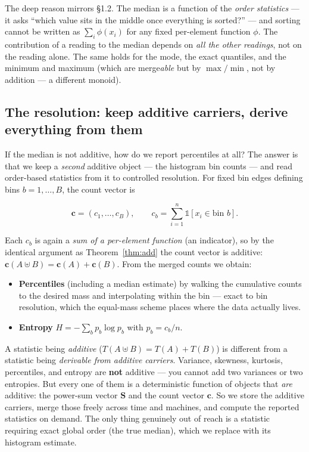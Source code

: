 \documentclass[11pt]{article}
\theoremstyle{definition}
\newcommand{\ind}{\mathbb{1}}
\newcommand{\powsum}{\mathbf{S}}
\begin{document}
The deep reason mirrors \S1.2. The median is a function of the \emph{order statistics} --- it asks
``which value sits in the middle once everything is sorted?'' --- and sorting cannot be written as
$\sum_i \phi(x_i)$ for any fixed per-element function $\phi$. The contribution of a reading to the
median depends on \emph{all the other readings}, not on the reading alone. The same holds for the
mode, the exact quantiles, and the minimum and maximum (which are merge\emph{able} but by
$\max/\min$, not by addition --- a different monoid).

\subsection{The resolution: keep additive carriers, derive everything from them}

If the median is not additive, how do we report percentiles at all? The answer is that we keep a
\emph{second} additive object --- the histogram bin counts --- and read order-based statistics from
it to controlled resolution. For fixed bin edges defining bins $b = 1, \dots, B$, the count vector is

\begin{equation}
  \mathbf{c} = (c_1, \dots, c_B),
  \qquad
  c_b = \sum_{i=1}^{n} \ind\!\left[x_i \in \text{bin } b\right].
\end{equation}

Each $c_b$ is again a \emph{sum of a per-element function} (an indicator), so by the identical
argument as Theorem~\ref{thm:add} the count vector is additive: $\mathbf{c}(A \uplus B)
= \mathbf{c}(A) + \mathbf{c}(B)$. From the merged counts we obtain:

\begin{itemize}[leftmargin=1.4em, itemsep=0.25em]
  \item \textbf{Percentiles} (including a median estimate) by walking the cumulative counts to the
        desired mass and interpolating within the bin --- exact to bin resolution, which the
        equal-mass scheme places where the data actually lives.
  \item \textbf{Entropy} $H = -\sum_b p_b \log p_b$ with $p_b = c_b / n$.
\end{itemize}

\begin{tcolorbox}[keybox, title={Additive vs.\ derived --- the distinction that organises everything}]
A statistic being \emph{additive} ($T(A\uplus B)=T(A)+T(B)$) is different from a statistic being
\emph{derivable from additive carriers}. Variance, skewness, kurtosis, percentiles, and entropy are
\textbf{not} additive --- you cannot add two variances or two entropies. But every one of them is a
deterministic function of objects that \emph{are} additive: the power-sum vector $\powsum$ and the
count vector $\mathbf{c}$. So we store the additive carriers, merge those freely across time and
machines, and compute the reported statistics on demand. The only thing genuinely out of reach is a
statistic requiring exact global order (the true median), which we replace with its histogram
estimate.
\end{tcolorbox}
\end{document}
